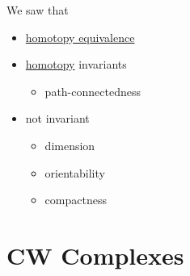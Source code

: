 \begin{prev}
	We saw that
	\begin{itemize}
		\item \hyperref[def:homotopy-equivalence]{homotopy equivalence}
		\item \hyperref[def:homotopy]{homotopy} invariants
		      \begin{itemize}
			      \item path-connectedness
		      \end{itemize}
		\item not invariant
		      \begin{itemize}
			      \item dimension
			      \item orientability
			      \item compactness
		      \end{itemize}
	\end{itemize}
\end{prev}

\section{CW Complexes}

